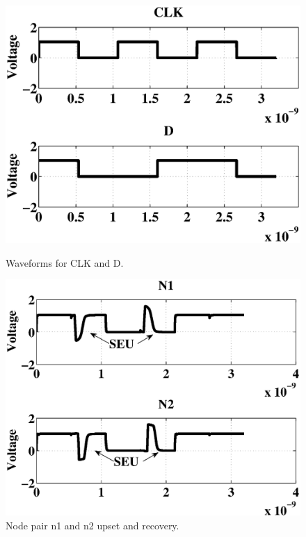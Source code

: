 \begin{figure}[!htbp]
\centering
\parbox{4cm}{
\includegraphics[width=1.15\linewidth]{Figures/WavePlots/CLKD.eps}
\caption{Waveforms for CLK and D.}
\label{fig:CLK}}
\qquad
\begin{minipage}{4cm}
\includegraphics[width=\linewidth]{Figures/WavePlots/n1n2.eps}
\caption{Node pair n1 and n2 upset and recovery.}
\label{fig:n1n2}
\end{minipage}
\end{figure}

